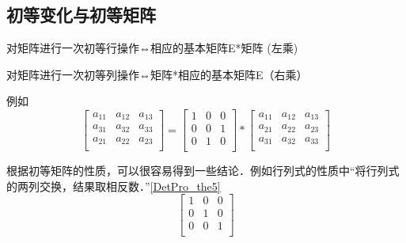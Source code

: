 \subsection{初等变化与初等矩阵}
\begin{theorem}{}
对矩阵进行一次初等行操作⇔相应的基本矩阵E*矩阵 (左乘)

对矩阵进行一次初等列操作⇔矩阵*相应的基本矩阵E（右乘）
\end{theorem}

\begin{example}{}
例如
\begin{equation}
\begin{bmatrix}
    a_{11} & a_{12} & a_{13}\\
    a_{31} & a_{32} & a_{33}\\
    a_{21} & a_{22} & a_{23}\\
\end{bmatrix}
=
    \begin{bmatrix}
        1 & 0 & 0\\
        0 & 0 & 1\\
        0 & 1 & 0\\
    \end{bmatrix}
*
\begin{bmatrix}
        a_{11} & a_{12} & a_{13}\\
        a_{21} & a_{22} & a_{23}\\
        a_{31} & a_{32} & a_{33}\\
\end{bmatrix}
\end{equation}
\end{example}

根据初等矩阵的性质，可以很容易得到一些结论．例如行列式的性质中“将行列式的两列交换，结果取相反数．”\autoref{DetPro_the5}~
$$
    \begin{bmatrix}
        1 & 0 & 0\\
        0 & 1 & 0\\
        0 & 0 & 1\\
    \end{bmatrix}
$$